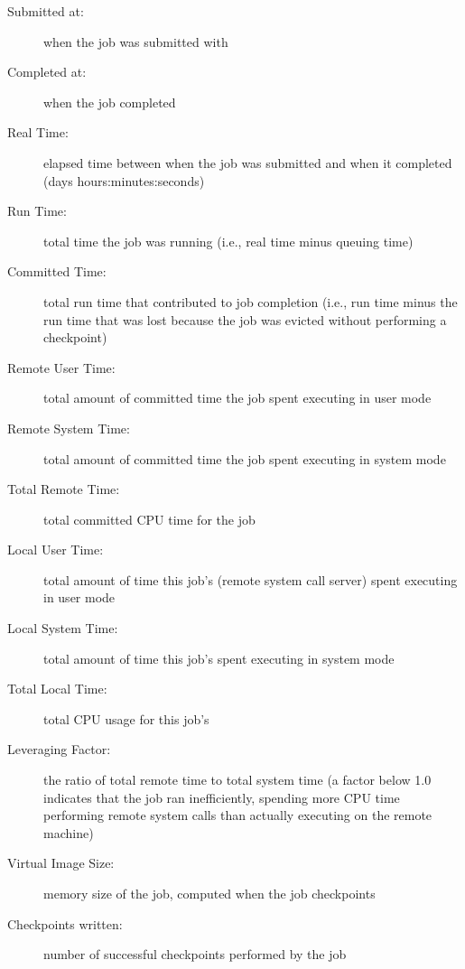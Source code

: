 \begin{description}

\item[Submitted at:] when the job was submitted with 

\item[Completed at:] when the job completed

\item[Real Time:] elapsed time between when the job was submitted and
when it completed (days hours:minutes:seconds)

\item[Run Time:] total time the job was running (i.e., real time minus
queuing time)

\item[Committed Time:] total run time that contributed to job
completion (i.e., run time minus the run time that was lost because
the job was evicted without performing a checkpoint)

\item[Remote User Time:] total amount of committed time the job spent
executing in user mode

\item[Remote System Time:] total amount of committed time the job spent
executing in system mode 

\item[Total Remote Time:] total committed CPU time for the job

\item[Local User Time:] total amount of time this job's
 (remote system call server) spent executing in user
mode

\item[Local System Time:] total amount of time this job's
 spent executing in system mode

\item[Total Local Time:] total CPU usage for this job's 

\item[Leveraging Factor:] the ratio of total remote time to total
system time (a factor below 1.0 indicates that the job ran
inefficiently, spending more CPU time performing remote system calls
than actually executing on the remote machine)

\item[Virtual Image Size:] memory size of the job, computed when the
job checkpoints

\item[Checkpoints written:] number of successful checkpoints performed
by the job


\end{description}
